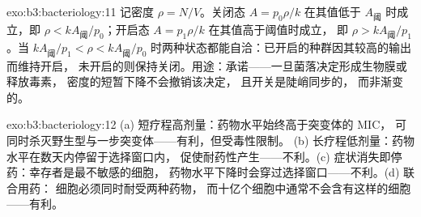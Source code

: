 \begin{solution}{exo:b3:bacteriology:11}
记密度 $\rho = N/V$。关闭态 $A = p_{0}\rho/k$ 在其值低于
$A_{\text{阈}}$ 时成立，即 $\rho < kA_{\text{阈}}/p_{0}$；开启态 $A = p_{1}\rho/k$ 在其值高于阈值时成立，
即 $\rho
> kA_{\text{阈}}/p_{1}$。当 $kA_{\text{阈}}/p_{1} < \rho <
kA_{\text{阈}}/p_{0}$ 时两种状态都能自洽：已开启的种群因其较高的输出而维持开启，
未开启的则保持关闭。用途：承诺——一旦菌落决定形成生物膜或释放毒素，
密度的短暂下降不会撤销该决定，
且开关是陡峭同步的，
而非渐变的。
\end{solution}

\begin{solution}{exo:b3:bacteriology:12}
(a) 短疗程高剂量：药物水平始终高于突变体的 MIC，
可同时杀灭野生型与一步突变体——有利，但受毒性限制。
(b) 长疗程低剂量：药物水平在数天内停留于选择窗口内，
促使耐药性产生——不利。(c) 症状消失即停药：幸存者是最不敏感的细胞，
药物水平下降时会穿过选择窗口——不利。(d) 联合用药：
细胞必须同时耐受两种药物，
而十亿个细胞中通常不会含有这样的细胞
——有利。
\end{solution}

